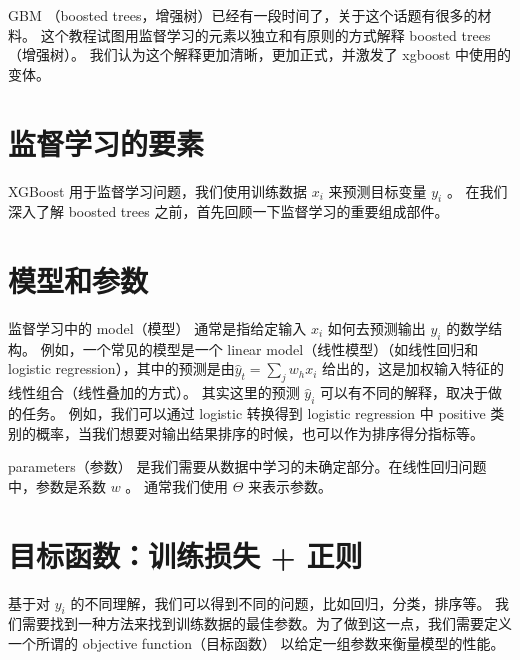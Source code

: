 \documentclass{article}
\begin{document}
GBM （boosted trees，增强树）已经有一段时间了，关于这个话题有很多的材料。 这个教程试图用监督学习的元素以独立和有原则的方式解释 boosted trees （增强树）。 我们认为这个解释更加清晰，更加正式，并激发了 xgboost 中使用的变体。

\section{监督学习的要素}
XGBoost 用于监督学习问题，我们使用训练数据 $x_i$ 来预测目标变量 $y_i$ 。 在我们深入了解 boosted trees 之前，首先回顾一下监督学习的重要组成部件。

\section{模型和参数}
监督学习中的 model（模型） 通常是指给定输入 $x_i$ 如何去预测输出 $y_i$ 的数学结构。 例如，一个常见的模型是一个 linear model（线性模型）（如线性回归和 logistic regression），其中的预测是由$ \hat{y}_t=\sum_j w_hx_{i}$ 给出的，这是加权输入特征的线性组合（线性叠加的方式）。 其实这里的预测 $\hat{y}_i$ 可以有不同的解释，取决于做的任务。 例如，我们可以通过 logistic 转换得到 logistic regression 中 positive 类别的概率，当我们想要对输出结果排序的时候，也可以作为排序得分指标等。

parameters（参数） 是我们需要从数据中学习的未确定部分。在线性回归问题中，参数是系数 $w$ 。 通常我们使用 $\Theta$ 来表示参数。

\section{目标函数：训练损失 + 正则}
基于对 $y_i$ 的不同理解，我们可以得到不同的问题，比如回归，分类，排序等。 我们需要找到一种方法来找到训练数据的最佳参数。为了做到这一点，我们需要定义一个所谓的 objective function（目标函数） 以给定一组参数来衡量模型的性能。
\end{document}

